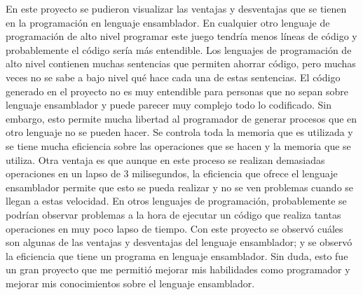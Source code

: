 \documentclass[12pt]{article}
\begin{document}
En este proyecto se pudieron visualizar las ventajas y desventajas que se tienen en la programación en lenguaje ensamblador. En cualquier otro lenguaje de programación de alto nivel programar este juego tendría menos líneas de código y probablemente el código sería más entendible. Los lenguajes de programación de alto nivel contienen muchas sentencias que permiten ahorrar código, pero muchas veces no se sabe a bajo nivel qué hace cada una de estas sentencias. El código generado en el proyecto no es muy entendible para personas que no sepan sobre lenguaje ensamblador y puede parecer muy complejo todo lo codificado. Sin embargo, esto permite mucha libertad al programador de generar procesos que en otro lenguaje no se pueden hacer. Se controla toda la memoria que es utilizada y se tiene mucha eficiencia sobre las operaciones que se hacen y la memoria que se utiliza. Otra ventaja es que aunque en este proceso se realizan demasiadas operaciones en un lapso de 3 milisegundos, la eficiencia que ofrece el lenguaje ensamblador permite que esto se pueda realizar y no se ven problemas cuando se llegan a estas velocidad. En otros lenguajes de programación, probablemente se podrían observar problemas a la hora de ejecutar un código que realiza tantas operaciones en muy poco lapso de tiempo. Con este proyecto se observó cuáles son algunas de las ventajas y desventajas del lenguaje ensamblador; y se observó la eficiencia que tiene un programa en lenguaje ensamblador. Sin duda, esto fue un gran proyecto que me permitió mejorar mis habilidades como programador y mejorar mis conocimientos sobre el lenguaje ensamblador.
\end{document}
